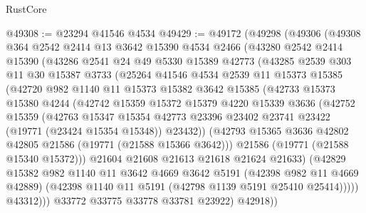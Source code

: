 \begin{lexlean}{RustCore}
\begin{coremodule}
@49308 := @23294 @41546 @4534
@49429 := @49172
    (@49298
      (@49306
        (@49308
          @364
          @2542
          @2414
          @13
          @3642
          @15390
          @4534
          @2466
          (@43280
            @2542
            @2414
            @15390
            (@43286
              @2541
              @24
              @49
              @5330
              @15389
              @42773
              (@43285
                @2539
                @303
                @11
                @30
                @15387
                @3733
                (@25264
                  @41546
                  @4534
                  @2539
                  @11
                  @15373
                  @15385
                  (@42720
                    @982
                    @1140
                    @11
                    @15373
                    @15382
                    @3642
                    @15385
                    (@42733
                      @15373
                      @15380
                      @4244
                      (@42742
                        @15359
                        @15372
                        @15379
                        @4220
                        @15339
                        @3636
                        (@42752
                          @15359
                          (@42763
                            @15347
                            @15354
                            @42773
                            @23396
                            @23402
                            @23741
                            @23422
                            (@19771 (@23424 @15354 @15348))
                            @23432))
                        (@42793 @15365 @3636 @42802 @42805 @21586 (@19771 (@21588 @15366 @3642)))
                        @21586
                        (@19771 (@21588 @15340 @15372)))
                      @21604
                      @21608
                      @21613
                      @21618
                      @21624
                      @21633)
                    (@42829
                      @15382
                      @982
                      @1140
                      @11
                      @3642
                      @4669
                      @3642
                      @5191
                      (@42398 @982 @11 @4669 @42889)
                      (@42398 @1140 @11 @5191 (@42798 @1139 @5191 @25410 @25414)))))
                @43312)))
          @33772
          @33775
          @33778
          @33781
          @23922)
        @42918))

\end{coremodule}
\end{lexlean}
